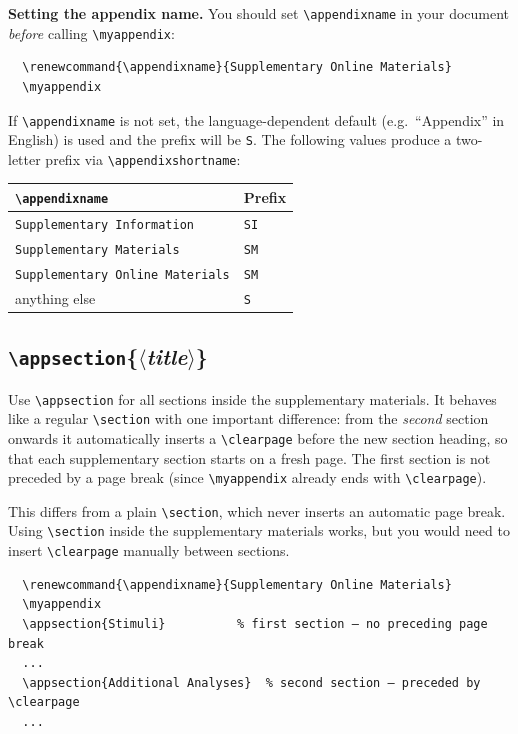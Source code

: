\documentclass[a4paper,11pt]{article}
\makeatletter
\newcommand{\cmd}[1]{\texttt{\textbackslash #1}}
\newcommand{\meta}[1]{\ensuremath{\langle}\textit{#1}\ensuremath{\rangle}}
\newcommand{\icmd}[1]{\cmd{#1}\index{#1@\texttt{\textbackslash #1}}}
\makeatother
\begin{document}
\noindent\textbf{Setting the appendix name.}  You should set
\cmd{appendixname} in your document \emph{before} calling
\cmd{myappendix}:

\begin{verbatim}
  \renewcommand{\appendixname}{Supplementary Online Materials}
  \myappendix
\end{verbatim}

If \cmd{appendixname} is not set, the language-dependent default
(e.g.\ ``Appendix'' in English) is used and the prefix will be
\texttt{S}. The following values produce a two-letter prefix via
\cmd{appendixshortname}:

\begin{center}
\begin{tabular}{ll}
\toprule
\cmd{appendixname} & Prefix \\
\midrule
\texttt{Supplementary Information}      & \texttt{SI} \\
\texttt{Supplementary Materials}        & \texttt{SM} \\
\texttt{Supplementary Online Materials} & \texttt{SM} \\
anything else                           & \texttt{S}  \\
\bottomrule
\end{tabular}
\end{center}

\subsection{\icmd{appsection}\{\meta{title}\}}

Use \cmd{appsection} for all sections inside the supplementary
materials.  It behaves like a regular \cmd{section} with one
important difference: from the \emph{second} section onwards it
automatically inserts a \cmd{clearpage} before the new section
heading, so that each supplementary section starts on a fresh page.
The first section is not preceded by a page break (since
\cmd{myappendix} already ends with \cmd{clearpage}).

This differs from a plain \cmd{section}, which never inserts an
automatic page break.  Using \cmd{section} inside the supplementary
materials works, but you would need to insert \cmd{clearpage}
manually between sections.

\begin{verbatim}
  \renewcommand{\appendixname}{Supplementary Online Materials}
  \myappendix
  \appsection{Stimuli}          % first section — no preceding page break
  ...
  \appsection{Additional Analyses}  % second section — preceded by \clearpage
  ...
\end{verbatim}
\end{document}
